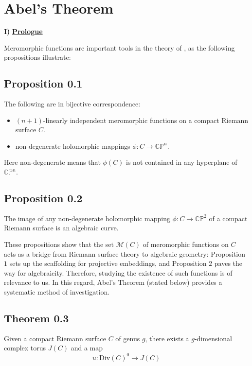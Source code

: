\documentclass[11pt,a4paper]{article}
\begin{document}
\section*{Abel's Theorem}
\textbf{I)} \underline{\textbf{Prologue}}

Meromorphic functions are important tools in the theory of , as the following propositions illustrate:

\subsection*{Proposition 0.1} The following are in bijective correspondence:
\begin{itemize}
    \item $(n+1)$-linearly independent meromorphic functions on a compact Riemann surface $C$.
    \item non-degenerate holomorphic mappings $\phi: C\rightarrow \mathbb{CP}^n$.
\end{itemize}
Here non-degenerate means that $\phi(C)$ is not contained in any hyperplane of $\mathbb{CP}^n$.


\subsection*{Proposition 0.2} The image of any non-degenerate holomorphic mapping $\phi:C\rightarrow \mathbb{CP}^2$ of a compact Riemann surface is an algebraic curve.

These propositions show that the set $\mathcal{M}(C)$ of meromorphic functions on $C$ acts as a bridge from Riemann surface theory to algebraic geometry: Proposition $1$ sets up the scaffolding for projective embeddings, and Proposition $2$ paves the way for algebraicity. Therefore, studying the existence of such functions is of relevance to us. In this regard, Abel's Theorem (stated below) provides a systematic method of investigation.

\subsection*{Theorem 0.3} Given a compact Riemann surface $C$ of genus $g$, there exists a $g$-dimensional complex torus $J(C)$ and a map
$$u:\text{Div}(C)^0 \rightarrow J(C)$$
\end{document}
